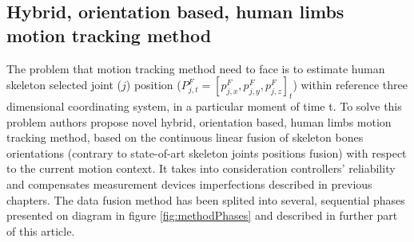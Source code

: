 \documentclass[sensors,article,submit,moreauthors,pdftex,10pt,a4paper]{mdpi}
\begin{document}
\subsection{Hybrid, orientation based, human limbs motion tracking method}
	The problem that motion tracking method need to face is to estimate human skeleton selected joint ($j$) position ($P^F_{j,t} = [p^F_{j,x}, p^F_{j,y}, p^F_{j,z}]_t$) within reference three dimensional coordinating system, in a particular moment of time t. To solve this problem authors propose novel hybrid, orientation based, human limbs motion tracking method, based on the continuous linear fusion of skeleton bones orientations (contrary to state-of-art skeleton joints positions fusion) with respect to the current motion context. It takes into consideration controllers’ reliability and compensates measurement devices imperfections described in previous chapters. The data fusion method has been splited into several, sequential phases presented on diagram in figure \ref{fig:methodPhases} and described in further part of this article. 
	
\end{document}
